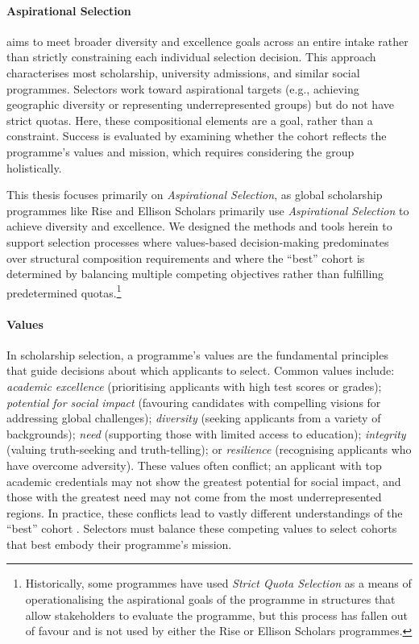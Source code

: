 \paragraph{Aspirational Selection} aims to meet broader diversity and excellence goals across an entire intake rather than strictly constraining each individual selection decision. This approach characterises most scholarship, university admissions, and similar social programmes. Selectors work toward aspirational targets (e.g., achieving geographic diversity or representing underrepresented groups) but do not have strict quotas. Here, these compositional elements are a goal, rather than a constraint. Success is evaluated by examining whether the cohort reflects the programme's values and mission, which requires considering the group holistically.

This thesis focuses primarily on \emph{Aspirational Selection}, as global scholarship programmes like Rise and Ellison Scholars primarily use \emph{Aspirational Selection} to achieve diversity and excellence. We designed the methods and tools herein to support selection processes where values-based decision-making predominates over structural composition requirements and where the ``best'' cohort is determined by balancing multiple competing objectives rather than fulfilling predetermined quotas.\footnote{Historically, some programmes have used \emph{Strict Quota Selection} as a means of operationalising the aspirational goals of the programme in structures that allow stakeholders to evaluate the programme, but this process has fallen out of favour and is not used by either the Rise or Ellison Scholars programmes.}


\paragraph{Values} In scholarship selection, a programme's values are the fundamental principles that guide decisions about which applicants to select. Common values include: \emph{academic excellence} (prioritising applicants with high test scores or grades); \emph{potential for social impact} (favouring candidates with compelling visions for addressing global challenges); \emph{diversity} (seeking applicants from a variety of backgrounds); \emph{need} (supporting those with limited access to education); \emph{integrity} (valuing truth-seeking and truth-telling); or \emph{resilience} (recognising applicants who have overcome adversity). These values often conflict; an applicant with top academic credentials may not show the greatest potential for social impact, and those with the greatest need may not come from the most underrepresented regions. In practice, these conflicts lead to vastly different understandings of the ``best'' cohort \cite{zimmerman_research_2014}. Selectors must balance these competing values to select cohorts that best embody their programme's mission.

